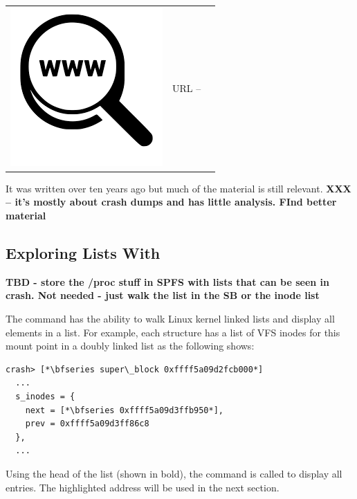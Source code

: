 \begin{table}[h]
\begin{tabular}{lcl}
\parbox[r]{0.5in}{\includegraphics[scale=0.15]{figures/url.png}} & \parbox[l]{0.55in}{URL  -- } & \parbox[l]{3in}{}
\end{tabular}
\end{table}

\noindent
It was written over ten years ago but much of the material is still relevant. \textbf{XXX -- it's mostly about crash dumps and has little analysis. FInd better material}


\subsection{Exploring Lists With }

\textbf{TBD - store the /proc stuff in SPFS with lists that can be seen in crash. Not needed - just walk the list in the SB or the inode list}

The  command has the ability to walk Linux kernel linked lists and display all elements in a list. For example, each  structure has a list of VFS inodes for this mount point in a doubly linked list as the following shows:

\begin{lstlisting}
crash> [*\bfseries super\_block 0xffff5a09d2fcb000*]
  ...
  s_inodes = {
    next = [*\bfseries 0xffff5a09d3ffb950*],
    prev = 0xffff5a09d3ff86c8
  },
  ...
\end{lstlisting}

\noindent
Using the head of the list (shown in bold), the  command is called to display all entries. The highlighted address will be used in the next section.

